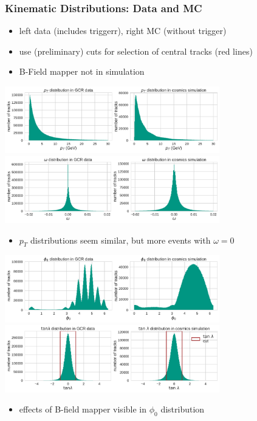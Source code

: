 \documentclass[18pt]{beamer}
\begin{document}
  \begin{frame}
    \frametitle{Kinematic Distributions: Data and MC}
    \begin{itemize}
    \item left data (includes triggerr), right MC (without trigger)
    \item use (preliminary) cuts for selection of central tracks (red lines)
    \item B-Field mapper not in simulation
    \end{itemize}
    \begin{center}
      \includegraphics[width=0.7\textwidth]{figures/distributions/gcr_pt_distribution_uncut.pdf}\\
      \includegraphics[width=0.7\textwidth]{figures/distributions/gcr_omega_distribution_uncut.pdf}
    \end{center}
    \begin{itemize}
    \item $p_T$ distributions seem similar, but more events with $\omega = 0$
    \end{itemize}
  \end{frame}

  \begin{frame}
    \begin{center}
      \includegraphics[width=0.7\textwidth]{figures/distributions/gcr_phi0_distribution_uncut.pdf}\\
      \includegraphics[width=0.7\textwidth]{figures/distributions/gcr_tan_lambda_distribution_uncut.pdf}
    \end{center}

    \begin{itemize}
    \item effects of B-field mapper visible in $\phi_0$ distribution
    \end{itemize}
  \end{frame}
\end{document}
